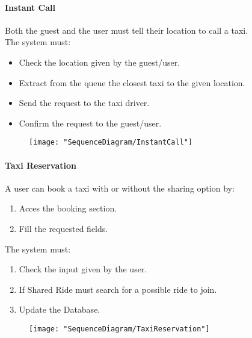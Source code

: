 		\paragraph{Instant Call}
			Both the guest and the user must tell their location to call a taxi.\\
			The system must:\begin{itemize}
				\item Check the location given by the guest/user.
				\item Extract from the queue the closest taxi to the given location.
				\item Send the request to the taxi driver.
				\item Confirm the request to the guest/user.
			\end{itemize}
			\begin{figure}[h!]
				\centering
				\texttt{[image: "SequenceDiagram/InstantCall"]}
			\end{figure}
			\newpage

		\paragraph{Taxi Reservation}
			A user can book a taxi with or without the sharing option by:\begin{enumerate}
				\item Acces the booking {section}.
				\item Fill the requested fields.
			\end{enumerate}
			The system must:\begin{enumerate}
				\item Check the input given by the user.
				\item If Shared Ride must search for a possible ride to join\askpippo.
				\item Update the Database.
			\end{enumerate}

			\begin{figure}[h!]
				\centering
				\texttt{[image: "SequenceDiagram/TaxiReservation"]}
			\end{figure}
			\newpage

